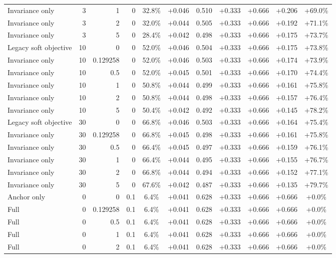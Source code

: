 \begin{table}[htbp]
\begin{tabular}{lrrrccccccc}
Invariance only & 3 & 1 & 0 & 32.8\% & +0.046 & 0.510 & +0.333 & +0.666 & +0.206 & +69.0\% \\
Invariance only & 3 & 2 & 0 & 32.0\% & +0.044 & 0.505 & +0.333 & +0.666 & +0.192 & +71.1\% \\
Invariance only & 3 & 5 & 0 & 28.4\% & +0.042 & 0.498 & +0.333 & +0.666 & +0.175 & +73.7\% \\
Legacy soft objective & 10 & 0 & 0 & 52.0\% & +0.046 & 0.504 & +0.333 & +0.666 & +0.175 & +73.8\% \\
Invariance only & 10 & 0.129258 & 0 & 52.0\% & +0.046 & 0.503 & +0.333 & +0.666 & +0.174 & +73.9\% \\
Invariance only & 10 & 0.5 & 0 & 52.0\% & +0.045 & 0.501 & +0.333 & +0.666 & +0.170 & +74.4\% \\
Invariance only & 10 & 1 & 0 & 50.8\% & +0.044 & 0.499 & +0.333 & +0.666 & +0.161 & +75.8\% \\
Invariance only & 10 & 2 & 0 & 50.8\% & +0.044 & 0.498 & +0.333 & +0.666 & +0.157 & +76.4\% \\
Invariance only & 10 & 5 & 0 & 50.4\% & +0.042 & 0.492 & +0.333 & +0.666 & +0.145 & +78.2\% \\
Legacy soft objective & 30 & 0 & 0 & 66.8\% & +0.046 & 0.503 & +0.333 & +0.666 & +0.164 & +75.4\% \\
Invariance only & 30 & 0.129258 & 0 & 66.8\% & +0.045 & 0.498 & +0.333 & +0.666 & +0.161 & +75.8\% \\
Invariance only & 30 & 0.5 & 0 & 66.4\% & +0.045 & 0.497 & +0.333 & +0.666 & +0.159 & +76.1\% \\
Invariance only & 30 & 1 & 0 & 66.4\% & +0.044 & 0.495 & +0.333 & +0.666 & +0.155 & +76.7\% \\
Invariance only & 30 & 2 & 0 & 66.8\% & +0.044 & 0.494 & +0.333 & +0.666 & +0.152 & +77.1\% \\
Invariance only & 30 & 5 & 0 & 67.6\% & +0.042 & 0.487 & +0.333 & +0.666 & +0.135 & +79.7\% \\
Anchor only & 0 & 0 & 0.1 & 6.4\% & +0.041 & 0.628 & +0.333 & +0.666 & +0.666 & +0.0\% \\
Full & 0 & 0.129258 & 0.1 & 6.4\% & +0.041 & 0.628 & +0.333 & +0.666 & +0.666 & +0.0\% \\
Full & 0 & 0.5 & 0.1 & 6.4\% & +0.041 & 0.628 & +0.333 & +0.666 & +0.666 & +0.0\% \\
Full & 0 & 1 & 0.1 & 6.4\% & +0.041 & 0.628 & +0.333 & +0.666 & +0.666 & +0.0\% \\
Full & 0 & 2 & 0.1 & 6.4\% & +0.041 & 0.628 & +0.333 & +0.666 & +0.666 & +0.0\% \\

\end{tabular}
\end{table}
